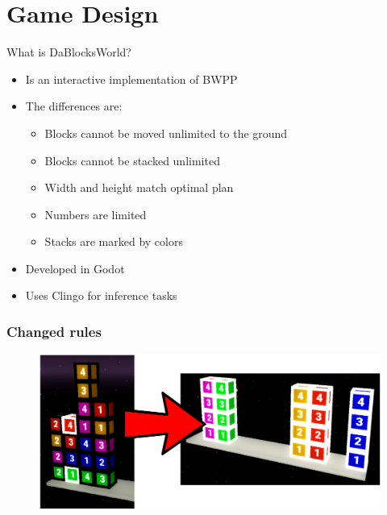 \documentclass[12pt]{beamer}
\begin{document}
    \section{Game Design}
        \begin{frame}[fragile]{What is DaBlocksWorld?}
            \begin{itemize}
                \item Is an interactive implementation of BWPP
                \item The differences are: 
                \begin{itemize}
                    \item Blocks cannot be moved unlimited to the ground
                    \item Blocks cannot be stacked unlimited
                    \item Width and height match optimal plan
                    \item Numbers are limited
                    \item Stacks are marked by colors
                \end{itemize}
                \item Developed in Godot
                \item Uses Clingo for inference tasks
            \end{itemize}
        \end{frame}

        \begin{frame}[fragile]
            \frametitle{Changed rules}
            \begin{figure}
                \includegraphics[width=\linewidth]{start_goal_config_colored.png}
            \end{figure} 
        \end{frame}
\end{document}
